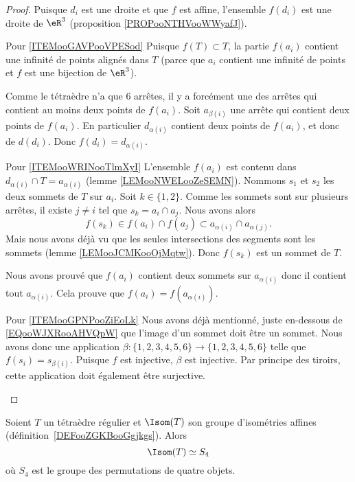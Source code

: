 \begin{proof}
	Puisque \( d_i\) est une droite et que \( f\) est affine, l'ensemble \( f(d_i)\) est une droite de \( \eR^3\) (proposition \ref{PROPooNTHVooWWyafJ}).

	\begin{subproof}
		\item[Pour \ref{ITEMooGAVPooVPESod}]
		Puisque \( f(T)\subset T\), la partie \( f(a_i)\) contient une infinité de points alignés dans \( T\) (parce que \( a_i\) contient une infinité de points et \( f\) est une bijection de \( \eR^3\)).

		Comme le tétraèdre n'a que \( 6\) arrêtes, il y a forcément une des arrêtes qui contient au moins deux points de \( f(a_i)\). Soit \( a_{\beta(i)}\) une arrête qui contient deux points de \( f(a_i)\). En particulier \( d_{\alpha(i)}\) contient deux points de \( f(a_i)\), et donc de \( d(d_i)\). Donc \( f(d_i)=d_{\alpha(i)}\).
		\item[Pour \ref{ITEMooWRINooTlmXyI}]
		L'ensemble \( f(a_i)\) est contenu dans \( d_{\alpha(i)}\cap T=a_{\alpha(i)}\) (lemme \ref{LEMooNWELooZeSEMN}). Nommons \( s_1\) et \( s_2\) les deux sommets de \( T\) sur \( a_i\). Soit \( k\in\{ 1,2 \}\). Comme les sommets sont sur plusieurs arrêtes, il existe \( j\neq i\) tel que \( s_k=a_i\cap a_j\). Nous avons alors
		\begin{equation}        \label{EQooWJXRooAHVQpW}
			f(s_k)\in f(a_i)\cap f(a_j)\subset a_{\alpha(i)}\cap a_{\alpha(j)}.
		\end{equation}
		Mais nous avons déjà vu que les seules intersections des segments sont les sommets (lemme \ref{LEMooJCMKooOjMqtw}). Donc \( f(s_k)\) est un sommet de \( T\).

		Nous avons prouvé que \( f(a_i)\) contient deux sommets sur \( a_{\alpha(i)}\) donc il contient tout \( a_{\alpha(i)}\). Cela prouve que \( f(a_i)=f(a_{\alpha(i)})\).
		\item[Pour \ref{ITEMooGPNPooZiEoLk}]
		Nous avons déjà mentionné, juste en-dessous de \eqref{EQooWJXRooAHVQpW} que l'image d'un sommet doit être un sommet. Nous avons donc une application \( \beta\colon \{ 1,2,3,4,5,6 \}\to \{ 1,2,3,4,5,6 \}\) telle que \( f(s_i)=s_{\beta(i)}\). Puisque \( f\) est injective, \( \beta\) est injective. Par principe des tiroirs, cette application doit également être surjective.
	\end{subproof}
\end{proof}

\begin{proposition}       \label{PROPooVNLKooOjQzCj}
	Soient \( T\) un tétraèdre régulier et \( \Isom(T)\) son groupe d'isométries affines (définition~\ref{DEFooZGKBooGgjkgs}). Alors
	\begin{equation}
		\Isom(T)\simeq S_4
	\end{equation}
	où \( S_4\) est le groupe des permutations de quatre objets.
\end{proposition}

